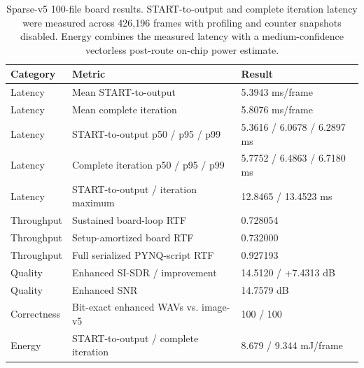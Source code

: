 \begin{table}[t]
  \centering
  \caption{Sparse-v5 100-file board results. START-to-output and complete
  iteration latency were measured across 426,196 frames with profiling and
  counter snapshots disabled. Energy combines the measured latency with a
  medium-confidence vectorless post-route on-chip power estimate.}
  \label{tab:sparse-v5-system-results}
  \begin{tabular}{@{}lll@{}}
    \toprule
    Category & Metric & Result \\
    \midrule
    Latency & Mean START-to-output & 5.3943 ms/frame \\
    Latency & Mean complete iteration & 5.8076 ms/frame \\
    Latency & START-to-output p50 / p95 / p99 & 5.3616 / 6.0678 / 6.2897 ms \\
    Latency & Complete iteration p50 / p95 / p99 & 5.7752 / 6.4863 / 6.7180 ms \\
    Latency & START-to-output / iteration maximum & 12.8465 / 13.4523 ms \\
    Throughput & Sustained board-loop RTF & 0.728054 \\
    Throughput & Setup-amortized board RTF & 0.732000 \\
    Throughput & Full serialized PYNQ-script RTF & 0.927193 \\
    Quality & Enhanced SI-SDR / improvement & 14.5120 / +7.4313 dB \\
    Quality & Enhanced SNR & 14.7579 dB \\
    Correctness & Bit-exact enhanced WAVs vs. image-v5 & 100 / 100 \\
    Energy & START-to-output / complete iteration & 8.679 / 9.344 mJ/frame \\
    \bottomrule
  \end{tabular}
\end{table}


